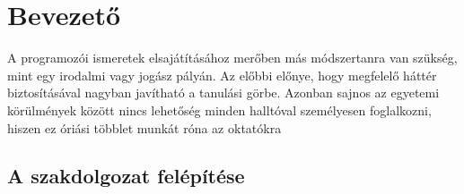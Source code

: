 \chapter*{Bevezető}

A programozói ismeretek elsajátításához merőben más módszertanra van szükség, mint egy irodalmi vagy jogász pályán. Az előbbi előnye, hogy megfelelő háttér biztosításával nagyban javítható a tanulási görbe. Azonban sajnos az egyetemi körülmények között nincs lehetőség minden halltóval személyesen foglalkozni, hiszen ez óriási többlet munkát róna az oktatókra

\section*{A szakdolgozat felépítése}